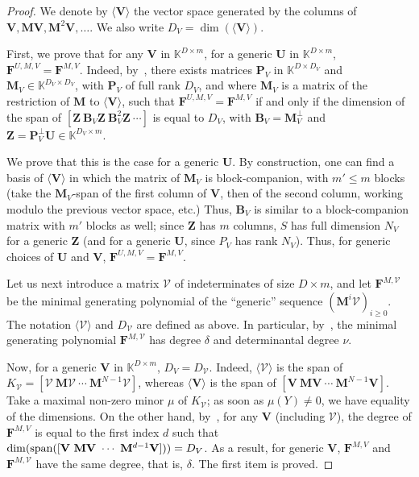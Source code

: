 \documentclass[12pt]{article}
\def\K {\ensuremath{\mathbb{K}}}
\def\scrV {\ensuremath{\mathscr{V}}}
\def\K{\mathbb{K}}
\def\mB{\mathbf{B}}
\def\mF{\mathbf{F}}
\def\mM{\mathbf{M}}
\def\mU{\mathbf{U}}
\def\mV{\mathbf{V}}
\def\mZ{\mathbf{Z}}
\begin{document}
\begin{proof}
	We denote by $\langle \mV \rangle$ the vector
	space generated by the columns of $\mV,\mM\mV,\mM^2\mV,\dots$. We also write
	$D_V=\dim(\langle \mV \rangle)$.
	
	First, we prove that for any $\mV$ in $\K^{D \times m}$, for a generic
	$\mU$ in $\K^{D\times m}$, $\mF^{U,M,V}=\mF^{M,V}$.  Indeed,
	by~\cite[Lemma~4.2]{Villard97a}, there exists matrices $\mathbf{P}_V$ in
	$\K^{D\times D_V}$ and $\mM_V \in \K^{D_V \times D_V}$, with $\mathbf{P}_V$ of
	full rank $D_V$, and where $\mM_V$ is a matrix of the restriction of $\mM$
	to $\langle \mV \rangle$, such that $\mF^{U,M,V}=\mF^{M,V}$ if and only if
	the dimension of the span of $[\mZ ~ \mB_V \mZ ~\mB_V^2 \mZ ~ \cdots]$ is equal to
	$D_V$, with $\mB_V=\mM_V^\perp$ and $\mZ=\mathbf{P}_V^\perp \mU \in \K^{D_V \times m}$.
	
	We prove that this is the case for a generic $\mU$. By construction, one
	can find a basis of $\langle \mV \rangle$ in which the matrix of $\mM_V$
	is block-companion, with $m' \le m$ blocks (take the $\mM_V$-span of the
	first column of $\mV$, then of the second column, working modulo the
	previous vector space, etc.) Thus, $\mB_V$ is similar to a
	block-companion matrix with $m'$ blocks as well; since $\mZ$ has $m$
	columns, $S$ has full dimension $N_V$ for a generic $\mZ$ (and for a
	generic $\mU$, since $P_V$ has rank $N_V$). Thus, for generic choices of
	$\mU$ and $\mV$, $\mF^{U,M,V}=\mF^{M,V}$.
	
	Let us next introduce a matrix $\scrV$ of indeterminates of size $D
	\times m$, and let $\mF^{M,\scrV}$ be the minimal generating polynomial
	of the ``generic'' sequence $(\mM^i \scrV)_{i \ge 0}$. The notation
	$\langle \scrV \rangle$ and $D_\scrV$ are defined as above.  In
	particular, by~\cite[Proposition 6.1]{Villard97a}, the minimal
	generating polynomial $\mF^{M,\scrV}$ has degree $\delta$ and
	determinantal degree $\nu$.
	
	Now, for a generic $\mV$ in $\K^{D\times m}$, $D_V=D_\scrV$. Indeed,
	$\langle \scrV\rangle$ is the span of $K_\scrV=[\scrV ~ \mM \scrV ~ \cdots ~
	\mM^{N-1} \scrV]$, whereas $\langle \mV \rangle$ is the span of $[\mV ~ \mM \mV
	~ \cdots ~\mM^{N-1} \mV]$. Take a maximal non-zero minor $\mu$ of
	$K_\scrV$; as soon as $\mu(Y)\ne 0$, we have equality of the
	dimensions. On the other hand, by~\cite[Lemma~4.3]{Villard97a}, for
	any $\mV$ (including $\scrV$), the degree of $\mF^{M,V}$ is equal to the
	first index $d$ such that $\dim({\rm span}([\mV ~ \mM \mV ~ \cdots ~\mM^{d-1}
	\mV]))=D_V$. As a result, for generic $\mV$, $\mF^{M,V}$ and $\mF^{M,\scrV}$
	have the same degree, that is, $\delta$.  The first item is proved.
	

\end{proof}
\end{document}
